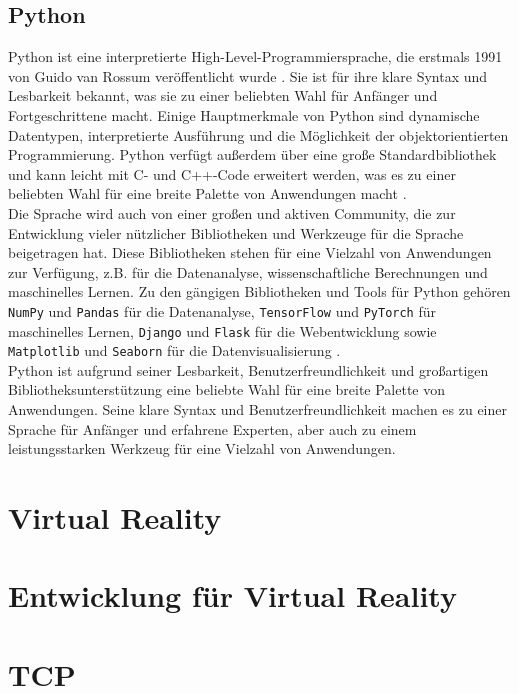\subsection{Python}\label{subsec:Python}
Python ist eine interpretierte High-Level-Programmiersprache, die erstmals 1991 von Guido van Rossum veröffentlicht wurde \cite{wiki-python}. Sie ist für ihre klare Syntax und Lesbarkeit bekannt, was sie zu einer beliebten Wahl für Anfänger und Fortgeschrittene macht. Einige Hauptmerkmale von Python sind dynamische Datentypen, interpretierte Ausführung und die Möglichkeit der objektorientierten Programmierung. Python verfügt außerdem über eine große Standardbibliothek und kann leicht mit C- und C++-Code erweitert werden, was es zu einer beliebten Wahl für eine breite Palette von Anwendungen macht \cite{offical-python}.\\
Die Sprache wird auch von einer großen und aktiven Community, die zur Entwicklung vieler nützlicher Bibliotheken und Werkzeuge für die Sprache beigetragen hat. Diese Bibliotheken stehen für eine Vielzahl von Anwendungen zur Verfügung, z.B. für die Datenanalyse, wissenschaftliche Berechnungen und maschinelles Lernen. Zu den gängigen Bibliotheken und Tools für Python gehören \texttt{NumPy} und \texttt{Pandas} für die Datenanalyse, \texttt{TensorFlow} und \texttt{PyTorch} für maschinelles Lernen, \texttt{Django} und \texttt{Flask} für die Webentwicklung sowie \texttt{Matplotlib} und \texttt{Seaborn} für die Datenvisualisierung \cite{PythonDataScienceHandbook}.\\
Python ist aufgrund seiner Lesbarkeit, Benutzerfreundlichkeit und großartigen Bibliotheksunterstützung eine beliebte Wahl für eine breite Palette von Anwendungen. Seine klare Syntax und Benutzerfreundlichkeit machen es zu einer Sprache für Anfänger und erfahrene Experten, aber auch zu einem leistungsstarken Werkzeug für eine Vielzahl von Anwendungen.\\


\section{Virtual Reality}

\section{Entwicklung für Virtual Reality}
\section{TCP}